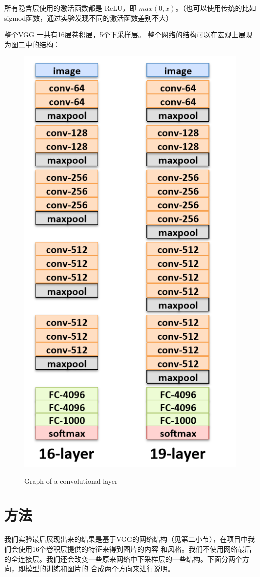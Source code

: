 \documentclass[10pt,a4paper]{ctexart}
\begin{document}
    所有隐含层使用的激活函数都是 ReLU，即 $ max(0,x)$。（也可以使用传统的比如sigmod函数，通过实验发现不同的激活函数差别不大）
	
    整个VGG 一共有16层卷积层，5个下采样层。
	整个网络的结构可以在宏观上展现为图二中的结构：
	\begin{figure}[h]
		\centering
		{\includegraphics[width=0.8\linewidth]{vgg.png}}
		\caption{Graph of a convolutional layer}
	\end{figure}
	\section{方法}
    我们实验最后展现出来的结果是基于VGG的网络结构（见第二小节），在项目中我们会使用16个卷积层提供的特征来得到图片的内容
    和风格。我们不使用网络最后的全连接层。我们还会改变一些原来网络中下采样层的一些结构。下面分两个方向，即模型的训练和图片的
    合成两个方向来进行说明。
\end{document}
